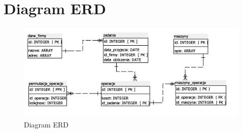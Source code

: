 \documentclass[a4paper]{article}
\begin{document}
\section{Diagram ERD}
\begin{figure}[h]
    \centering
    \includegraphics[width=\textwidth]{erd.png}
    \caption{Diagram ERD}
    \label{fig:erd_image}
\end{figure}
\end{document}
